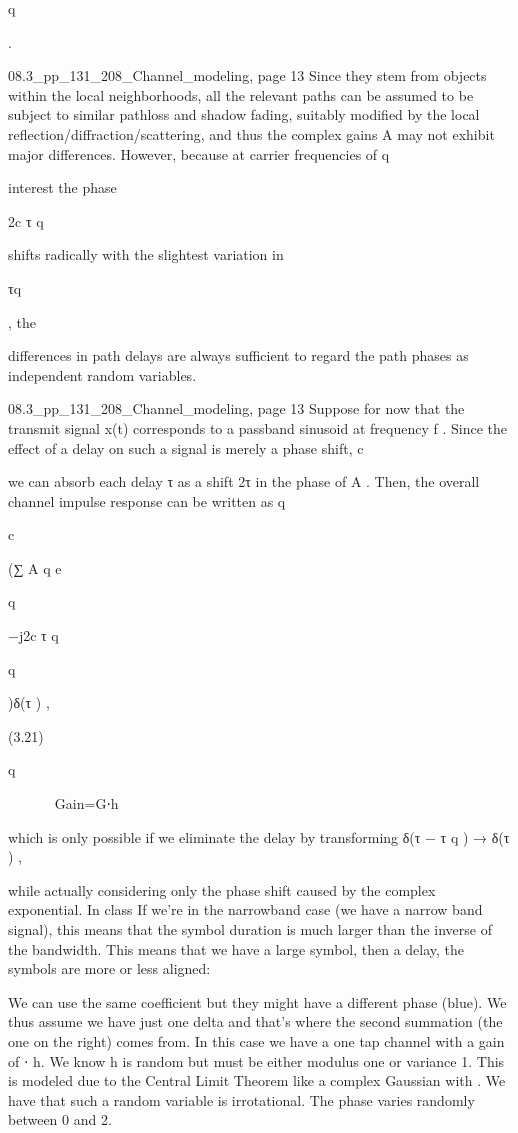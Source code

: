 {{{{q

.

08.3_pp_131_208_Channel_modeling, page 13 Since they stem from objects within the local neighborhoods, all the relevant paths can be assumed to be subject to similar pathloss and shadow fading, suitably modified by the local reflection/diffraction/scattering, and thus the complex gains
{A } may not exhibit major differences. However, because at carrier frequencies of q

interest the phase

2\pif c τ q

shifts radically with the slightest variation in

τq

, the

differences in path delays are always sufficient to regard the path phases as independent random variables.

08.3_pp_131_208_Channel_modeling, page 13 Suppose for now that the transmit signal x(t) corresponds to a passband sinusoid at frequency f . Since the effect of a delay on such a signal is merely a phase shift,
c

we can absorb each delay τ as a shift 2\pif τ in the phase of A . Then, the overall channel impulse response can be written as q

c

(∑ A q e

q

−j2\pif c τ q

q

)δ(τ ) ,

(3.21)

q






Gain=\sqrt G⋅h

which is only possible if we eliminate the delay by transforming δ(τ − τ q ) → δ(τ ) ,

while actually considering only the phase shift caused by the complex exponential.
In class If we're in the narrowband case (we have a narrow band signal), this means that the symbol duration is much larger than the inverse of the bandwidth.
This means that we have a large symbol, then a delay, the symbols are more or less aligned:

We can use the same coefficient but they might have a different phase (blue).
We thus assume we have just one delta and that's where the second summation
(the one on the right) comes from.
In this case we have a one tap channel with a gain of \sqrtG ⋅ h. We know h is random but must be either modulus one or variance 1.
This is modeled due to the Central Limit Theorem like a complex Gaussian with
. We have that such a random variable is irrotational. The phase varies randomly between 0 and 2\pi.
\sigma

}}}}
